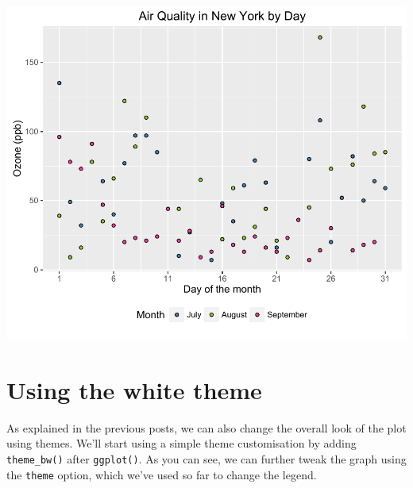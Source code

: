 \begin{center}\includegraphics[width=0.6\linewidth]{5_Scatter_Plots_pdf/scatter_11-1} \end{center}

\section{Using the white theme}\label{using-the-white-theme}

As explained in the previous posts, we can also change the overall look
of the plot using themes. We'll start using a simple theme customisation
by adding \texttt{theme\_bw()} after \texttt{ggplot()}. As you can see,
we can further tweak the graph using the \texttt{theme} option, which
we've used so far to change the legend.

\begin{Shaded}
\begin{Highlighting}[]
\StringTok{ }\NormalTok{(}   
\StringTok{  }\NormalTok{(} \NormalTok{) +}
\StringTok{  }\NormalTok{(}\NormalTok{) +}\StringTok{ }
\StringTok{  }\NormalTok{(} \NormalTok{, } \NormalTok{, } \NormalTok{) +}
\StringTok{  }\NormalTok{(} \NormalTok{(}\NormalTok{, }\NormalTok{, }\NormalTok{)) +}
\StringTok{  }\NormalTok{(} 
\StringTok{  }\NormalTok{(} \NormalTok{(}\NormalTok{, }\NormalTok{)) +}
\StringTok{  }\NormalTok{() +}
\StringTok{  }\NormalTok{(}\NormalTok{, }\NormalTok{)}
\end{Highlighting}
\end{Shaded}

